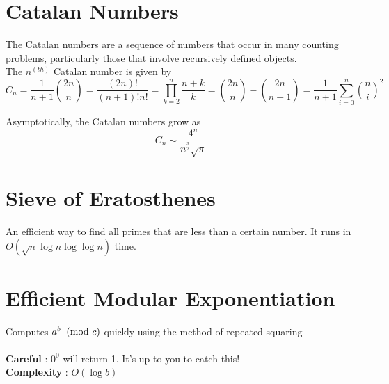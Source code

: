 	
	
	\section{Catalan Numbers}
	
	\indent The Catalan numbers are a sequence of numbers that occur in many counting 
	problems, particularly those that involve recursively defined objects. \\
	
	\indent The $n^(th)$ Catalan number is given by
	$$C_n = \frac{1}{n+1}{{2n}\choose{n}} = 
	\frac{(2n)!}{(n+1)!n!} = 
	\prod_{k = 2}^{n}\frac{n+k}{k} = 
	{{2n}\choose{n}} - {{2n}\choose{n+1}} = 
	\frac{1}{n+1}\sum_{i=0}^{n}{{n}\choose{i}}^2$$
	
	Asymptotically, the Catalan numbers grow as $$C_n \sim \frac{4^n}{n^{\frac{3}{2}}\sqrt{\pi}}$$
	
	
	
	\section{Sieve of Eratosthenes}
	An efficient way to find all primes that are less than a certain number.
	It runs in $O(\sqrt{n}\log{n}\log{\log{n}})$ time. \\
	
	
	
	\section{Efficient Modular Exponentiation}
	
	Computes $a^b\imod{c}$ quickly using the method of repeated squaring \\
	\ \\
	{\bf Careful} : $0^0$ will return 1. It's up to you to catch this! \\
	{\bf Complexity} : $O\left(\log{b}\right)$ \\
	
	
	
